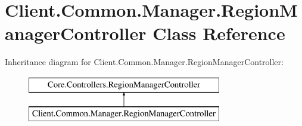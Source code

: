 \hypertarget{classClient_1_1Common_1_1Manager_1_1RegionManagerController}{\section{Client.\-Common.\-Manager.\-Region\-Manager\-Controller Class Reference}
\label{classClient_1_1Common_1_1Manager_1_1RegionManagerController}
}
Inheritance diagram for Client.\-Common.\-Manager.\-Region\-Manager\-Controller\-:\begin{figure}[H]
\begin{center}
\leavevmode
\includegraphics[height=2.000000cm]{classClient_1_1Common_1_1Manager_1_1RegionManagerController}
\end{center}
\end{figure}
